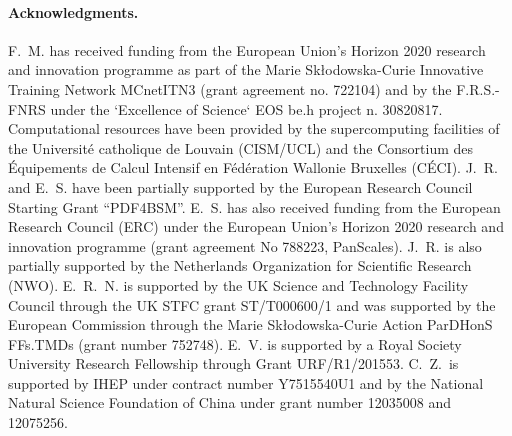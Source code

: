 \paragraph{Acknowledgments.}
%
F.~M. has received funding from the European Union's Horizon 2020 research and innovation programme as part of the Marie Sk\l{}odowska-Curie Innovative Training Network MCnetITN3 (grant agreement no. 722104) and by the F.R.S.-FNRS under the `Excellence of Science` EOS be.h project n. 30820817.
%
Computational resources have been provided by the supercomputing facilities of the Universit\'e catholique de Louvain (CISM/UCL) and the Consortium des \'Equipements de Calcul Intensif en F\'ed\'eration Wallonie Bruxelles (C\'ECI). 
%
J.~R. and E.~S. have been partially supported by the European Research Council Starting
Grant ``PDF4BSM''.
E.~S. has also received funding from the European Research Council (ERC) under the European Union’s Horizon 2020 research and innovation programme (grant agreement No 788223, PanScales).
%
J.~R. is also partially supported by the Netherlands Organization for Scientific
Research (NWO).
%
E.~R.~N. is supported by the UK Science and Technology Facility Council through
the UK STFC grant ST/T000600/1 and was supported by the European Commission
through the Marie  Sk\l{}odowska-Curie Action ParDHonS FFs.TMDs
(grant number 752748).
%
E.~V. is supported by a Royal Society University Research Fellowship through Grant URF/R1/201553.
%
C.~Z.~is supported by IHEP under contract number Y7515540U1 and by the National Natural
Science Foundation of China under grant number 12035008 and 12075256.

